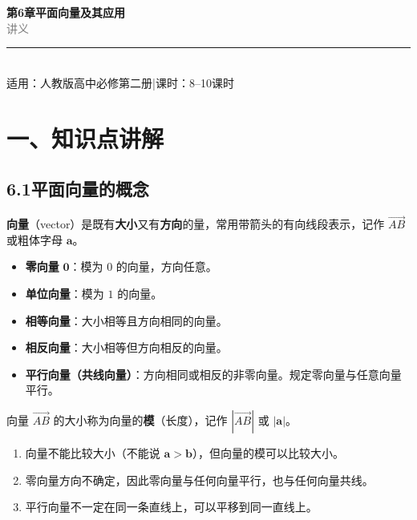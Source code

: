 \documentclass[12pt, a4paper]{ctexart}
\begin{document}
\begin{center}
{\Huge\bfseries\textcolor{mainblue}{第6章\quad 平面向量及其应用}}\\[12pt]
{\Large\textcolor{gray}{讲\quad 义}}\\[8pt]
\rule{0.6\textwidth}{1pt}\\[8pt]
{\normalsize 适用：人教版\quad 高中必修第二册\quad |\quad 课时：8--10课时}
\end{center}
\vspace{10pt}

\section*{\textcolor{mainblue}{一、知识点讲解}}

\subsection*{6.1\quad 平面向量的概念}

\begin{knowledgebox}[向量的定义]
\textbf{向量}（vector）是既有\textbf{大小}又有\textbf{方向}的量，常用带箭头的有向线段表示，记作 $\overrightarrow{AB}$ 或粗体字母 $\boldsymbol{a}$。

\begin{itemize}[leftmargin=2em]
  \item \textbf{零向量} $\boldsymbol{0}$：模为 $0$ 的向量，方向任意。
  \item \textbf{单位向量}：模为 $1$ 的向量。
  \item \textbf{相等向量}：大小相等且方向相同的向量。
  \item \textbf{相反向量}：大小相等但方向相反的向量。
  \item \textbf{平行向量（共线向量）}：方向相同或相反的非零向量。规定零向量与任意向量平行。
\end{itemize}

向量 $\overrightarrow{AB}$ 的大小称为向量的\textbf{模}（长度），记作 $|\overrightarrow{AB}|$ 或 $|\boldsymbol{a}|$。
\end{knowledgebox}

\begin{warnbox}[易错提醒]
\begin{enumerate}[leftmargin=2em]
  \item 向量不能比较大小（不能说 $\boldsymbol{a}>\boldsymbol{b}$），但向量的模可以比较大小。
  \item 零向量方向不确定，因此零向量与任何向量平行，也与任何向量共线。
  \item 平行向量不一定在同一条直线上，可以平移到同一直线上。
\end{enumerate}
\end{warnbox}
\end{document}
